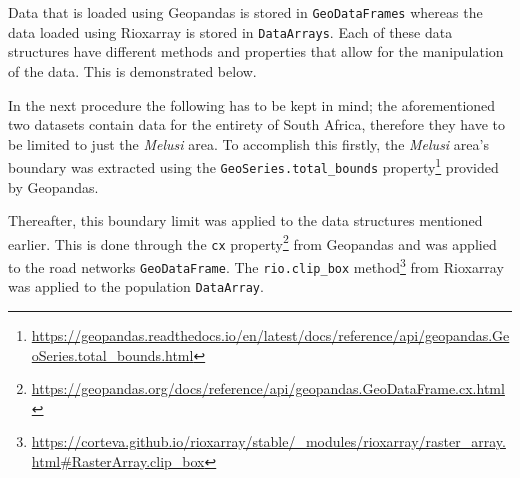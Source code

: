 Data that is loaded using Geopandas is stored in \texttt{GeoDataFrames} whereas the data loaded using Rioxarray is stored in \texttt{DataArrays}. Each of these data structures have different methods and properties that allow for the manipulation of the data. This is demonstrated below.

In the next procedure the following has to be kept in mind; the aforementioned two datasets contain data for the entirety of South Africa, therefore they have to be limited to just the \textit{Melusi} area. To accomplish this firstly, the \textit{Melusi} area's boundary was extracted using the \texttt{GeoSeries.total\_bounds} property\footnote{\url{https://geopandas.readthedocs.io/en/latest/docs/reference/api/geopandas.GeoSeries.total_bounds.html}} provided by Geopandas.

Thereafter, this boundary limit was applied to the data structures mentioned earlier. This is done through the \texttt{cx} property\footnote{\url{https://geopandas.org/docs/reference/api/geopandas.GeoDataFrame.cx.html}} from Geopandas and was applied to the road networks \texttt{GeoDataFrame}. The \texttt{rio.clip\_box} method\footnote{\url{https://corteva.github.io/rioxarray/stable/_modules/rioxarray/raster_array.html\#RasterArray.clip_box}} from Rioxarray was applied to the population \texttt{DataArray}.

